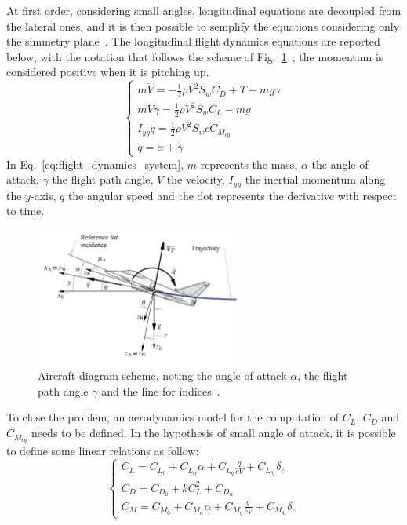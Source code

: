 At first order, considering small angles, longitudinal equations are decoupled from the lateral ones, and it is then possible to semplify the equations considering only the simmetry plane~\cite{bib:roskam_flight_dynamics}. 
The longitudinal flight dynamics equations are reported below, with the notation that follows the scheme of Fig.~\ref{fig:aircraft_flight_dynamics_scheme}~\cite{bib:kuethe, bib:agodemar_dsv}; the momentum is considered positive when it is pitching up.
\begin{equation}
	\label{eq:flight_dynamics_system}
	\left\{\begin{array}{l}
		m\dot{V} = -\frac{1}{2}\rho V^2 S_w C_D + T - mg\gamma \\
		mV\dot{\gamma} = \frac{1}{2}\rho V^2 S_w C_L -mg \\
		I_{yy}\dot{q} = \frac{1}{2}\rho V^2 S_w \bar{c} C_{M_{cg}} \\
		\dot{q} = \dot{\alpha} + \dot{\gamma}
	\end{array}\right.
\end{equation}
In Eq.~\eqref{eq:flight_dynamics_system}, $m$ represents the mass, $\alpha$ the angle of attack, $\gamma$ the flight path angle, $V$ the velocity, $I_{yy}$ the inertial momentum along the $y$-axis, $q$ the angular speed and the dot represents the derivative with respect to time. 
\begin{figure}[!h]
	\centering
	\includegraphics[keepaspectratio, width=0.6\textwidth]{images/chap4/aircraft_flight_dynamics_scheme.jpg}
	\caption{Aircraft diagram scheme, noting the angle of attack $\alpha$, the flight path angle $\gamma$ and the line for indices~\cite{bib:agodemar_dsv}.}
	\label{fig:aircraft_flight_dynamics_scheme}
\end{figure}

To close the problem, an aerodynamics model for the computation of $C_L$, $C_D$ and $C_{M_{cg}}$ needs to be defined. 
In the hypothesis of small angle of attack, it is possible to define some linear relations as follow:
\begin{equation}
	\label{eq:aero_model_flight_dynamics}
	\left\{\begin{array}{l}
		C_L = C_{L_{0}} + C_{L_{\alpha}}\alpha + C_{L_{q}} \frac{q}{\bar{c}{V}} + C_{L_{\delta_{e}}}\delta_{e} \\
		C_D = C_{D_{0}} + k C_L^2 + C_{D_{w}} \\
		C_M = C_{M_{0}} + C_{M_{\alpha}}\alpha + C_{M_{q}} \frac{q}{\bar{c}{V}} + C_{M_{\delta_{e}}}\delta_{e} 
	\end{array}\right.
\end{equation}

